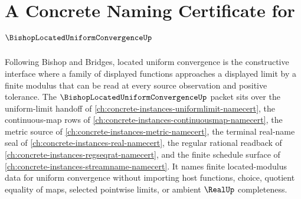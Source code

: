 \chapter{A Concrete Naming Certificate for $\BishopLocatedUniformConvergenceUp$}
\label{ch:concrete-instances-bishop-located-uniform-convergence-namecert}

Following Bishop and Bridges, located uniform convergence is the constructive interface where a family of displayed functions approaches a displayed limit by a finite modulus that can be read at every source observation and positive tolerance. The $\BishopLocatedUniformConvergenceUp$ packet sits over the uniform-limit handoff of \autoref{ch:concrete-instances-uniformlimit-namecert}, the continuous-map rows of \autoref{ch:concrete-instances-continuousmap-namecert}, the metric source of \autoref{ch:concrete-instances-metric-namecert}, the terminal real-name seal of \autoref{ch:concrete-instances-real-namecert}, the regular rational readback of \autoref{ch:concrete-instances-regseqrat-namecert}, and the finite schedule surface of \autoref{ch:concrete-instances-streamname-namecert}. It names finite located-modulus data for uniform convergence without importing host functions, choice, quotient equality of maps, selected pointwise limits, or ambient $\RealUp$ completeness.

